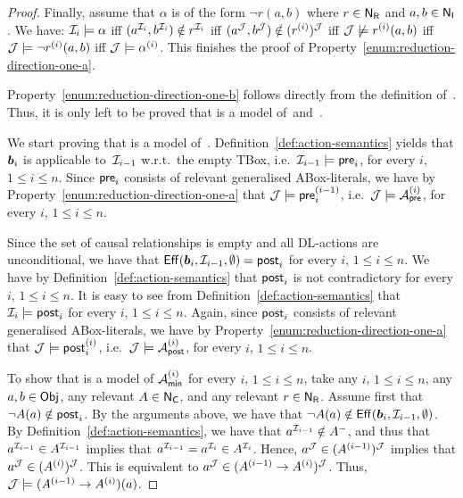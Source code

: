 \begin{proof}
    Finally, assume that $\alpha$ is of the form $\lnot r(a,b)$ where $r\in\mathsf{N_R}$
    and $a,b\in\mathsf{N_I}$.  We have: $\mathcal{I}_i\models\alpha$ iff
    $(a^{\mathcal{I}_i},b^{\mathcal{I}_i})\notin r^{\mathcal{I}_i}$ iff
    $(a^\mathcal{J},b^\mathcal{J})\notin(r^{(i)})^\mathcal{J}$ iff $\mathcal{J}\not\models r^{(i)}(a,b)$ iff
    $\mathcal{J}\models\lnot r^{(i)}(a,b)$ iff $\mathcal{J}\models\alpha^{(i)}$.
    This finishes the proof of Property~\eqref{enum:reduction-direction-one-a}.

    Property~\eqref{enum:reduction-direction-one-b} follows directly from the
    definition of~\Jmc.  Thus, it is only left to be proved that \Jmc is a model
    of~\Ared and~\Tred.

    We start proving that \Jmc is a model of~\Ared.
    Definition~\ref{def:action-semantics} yields that $\boldsymbol b_i$ is applicable
    to~$\mathcal{I}_{i-1}$ w.r.t.\ the empty TBox, i.e.~$\mathcal{I}_{i-1}\models\mathsf{pre}_i$, for
    every $i$, $1\le i\le n$.  Since $\mathsf{pre}_i$ consists of relevant generalised
    ABox-literals, we have by Property~\eqref{enum:reduction-direction-one-a}
    that $\mathcal{J}\models\mathsf{pre}_i^{(i-1)}$, i.e.~$\mathcal{J}\models\mathcal{A}_\mathsf{pre}^{(i)}$, for every
    $i$, $1\le i\le n$.

    Since the set of causal relationships is empty and all DL-actions are
    unconditional, we have that $\operatorname{\mathsf{Eff}}(\boldsymbol b_i,\mathcal{I}_{i-1},\emptyset)=\mathsf{post}_i$ for
    every $i$, $1\le i\le n$.  We have by Definition~\ref{def:action-semantics}
    that $\mathsf{post}_i$ is not contradictory for every $i$, $1\le i\le n$.  It is
    easy to see from Definition~\ref{def:action-semantics} that
    $\mathcal{I}_i\models\mathsf{post}_i$ for every $i$, $1\le i\le n$.  Again, since $\mathsf{post}_i$
    consists of relevant generalised ABox-literals, we have by
    Property~\eqref{enum:reduction-direction-one-a} that
    $\mathcal{J}\models\mathsf{post}_i^{(i)}$, i.e.~$\mathcal{J}\models\mathcal{A}_\mathsf{post}^{(i)}$, for every $i$,
    $1\le i\le n$.

    To show that \Jmc is a model of $\mathcal{A}_\mathsf{min}^{(i)}$ for every $i$, $1\le i\le n$,
    take any $i$, $1\le i\le n$, any $a,b\in\mathsf{Obj}$, any relevant $A\in\mathsf{N_C}$, and
    any relevant $r\in\mathsf{N_R}$.
    Assume first that $\lnot A(a)\notin\mathsf{post}_i$.  By the arguments above, we
    have that $\lnot A(a)\notin\operatorname{\mathsf{Eff}}(\boldsymbol b_i,\mathcal{I}_{i-1},\emptyset)$.  By
    Definition~\ref{def:action-semantics}, we have that
    $a^{\mathcal{I}_{i-1}}\notin A^-$, and thus that $a^{\mathcal{I}_{i-1}}\in A^{\mathcal{I}_{i-1}}$
    implies that $a^{\mathcal{I}_{i-1}}=a^{\mathcal{I}_i}\in A^{\mathcal{I}_i}$.  Hence,
    $a^\mathcal{J}\in(A^{(i-1)})^\mathcal{J}$ implies that $a^\mathcal{J}\in(A^{(i)})^\mathcal{J}$.  This is
    equivalent to $a^\mathcal{J}\in(A^{(i-1)}\to A^{(i)})^\mathcal{J}$.  Thus,
    $\mathcal{J}\models(A^{(i-1)}\to A^{(i)})(a)$.


\end{proof}
